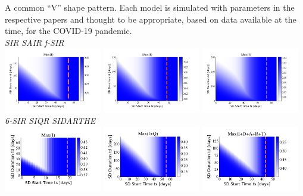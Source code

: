 \documentclass[10pt]{beamer}
\begin{document}
\begin{frame}{A common ``V'' shape pattern.}
	Each model is simulated with parameters in the respective papers and thought to be appropriate, based on data available at the time, for the COVID-19 pandemic.\\  \vspace{0.5cm}
	\hspace{1cm}  \textit{SIR} \hspace{2.5cm} \textit{SAIR} \hspace{2.1cm} \textit{f-SIR} \\
	\includegraphics[width=0.32\textwidth]{epidemic-sir-heatmap.png}
	\includegraphics[width=0.32\textwidth]{epidemic-sair.png}
	\includegraphics[width=0.32\textwidth]{epidemic-fsir.png}\\
	\hspace{0.8cm}  \textit{6-SIR} \hspace{2.3cm} \textit{SIQR} \hspace{1.8cm} \textit{SIDARTHE} \\
	\includegraphics[width=0.32\textwidth]{epidemic-sixsir.png}
	\includegraphics[width=0.32\textwidth]{epidemic-siqr.png}
	\includegraphics[width=0.32\textwidth]{epidemic-sidarthe.png}
\end{frame}
\end{document}
